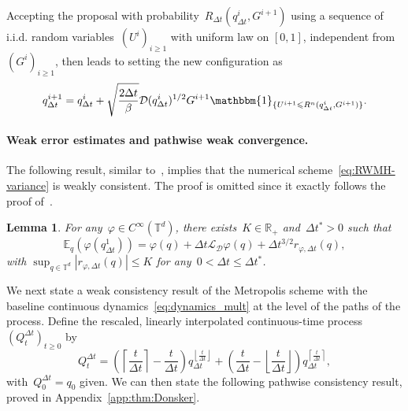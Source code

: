 \documentclass{article}
\newtheorem{lemma}{Lemma}
\newcommand{\cL}{\mathcal{L}}
\renewcommand{\leq}{\leqslant}
\renewcommand{\geq}{\geqslant}
\def\T{\mathbb{T}}
\newcommand{\Diff}{\mathcal{D}}
\renewcommand{\dim}{d}
\newcommand{\cLD}{\cL_\Diff}
\begin{document}
Accepting the proposal with probability~$R_{\Delta t}(q^i_{\Delta t},G^{i+1})$ using a sequence of i.i.d. random variables~$(U^i)_{i\geq 1}$ with uniform law on $[0,1]$, independent from $(G^i)_{i\geq 1}$, then leads to setting the new configuration as 
\begin{equation}
  \label{eq:RWMH-variance}
  q^{i+1}_{\Delta t} = q^i_{\Delta t} + \sqrt{\frac{2\Delta t}{\beta}}\Diff(q^i_{\Delta t})^{1/2}G^{i+1}\mathbbm{1}_{\{U^{i+1}\leq R^n(q^i_{\Delta t},G^{i+1})\}}.
\end{equation}

\paragraph{Weak error estimates and pathwise weak convergence.}
The following result, similar to~\cite[Lemma~4]{FS17}, implies that the numerical scheme~\eqref{eq:RWMH-variance} is weakly consistent. The proof is omitted since it exactly follows the proof of~\cite[Lemma~4]{FS17}. %

\begin{lemma}
  For any~$\varphi \in C^\infty(\T^\dim)$, there exists~$K \in \mathbb{R}_+$ and~$\Delta t^\ast > 0$ such that 
  \[
  \mathbb{E}_q\left( \varphi(q_{\Delta t}^1) \right) = \varphi(q) + \Delta t \cLD \varphi(q) + \Delta t^{3/2} r_{\varphi,\Delta t}(q),
  \]
  with $\sup_{q \in \T^\dim} |r_{\varphi,\Delta t}(q)| \leq K$ for any~$0 < \Delta t \leq \Delta t^\ast$.
\end{lemma}

We next state a weak consistency result of the Metropolis scheme with the baseline continuous dynamics~\eqref{eq:dynamics_mult} at the level of the paths of the process. Define the rescaled, linearly interpolated continuous-time process $(Q^{\Delta t}_t)_{t \geq 0}$ by
\begin{equation}
\label{eq:process}
Q^{\Delta t}_t =\left (\left \lceil \frac{t}{\Delta t} \right \rceil - \frac{t}{\Delta t}\right)q_{\Delta t}^{\left \lfloor \frac{t}{\Delta t} \right \rfloor} + \left(\frac{t}{\Delta t} - \left \lfloor \frac{t}{\Delta t} \right \rfloor\right)q_{\Delta t}^{\left \lceil \frac{t}{\Delta t} \right \rceil},
\end{equation}
with~$Q_0^{\Delta t} = q_0$ given. We can then state the following pathwise consistency result, proved in Appendix~\ref{app:thm:Donsker}.
\end{document}
